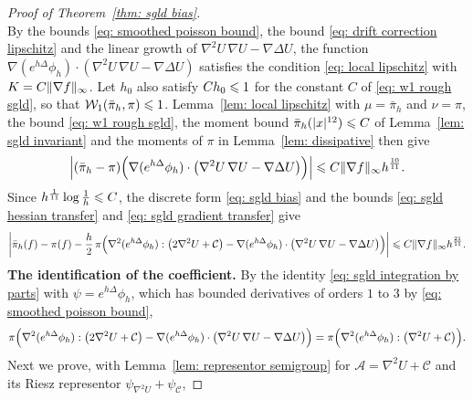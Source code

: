 \begin{proof}[Proof of Theorem~\ref{thm: sgld bias}]
\begin{equation}
    \end{equation}
    By the bounds \eqref{eq: smoothed poisson bound}, the bound \eqref{eq: drift correction lipschitz} and the linear growth of $\nabla^2 U\, \nabla U - \nabla \Delta U$, the function $\nabla ( e^{h\Delta} \phi_h ) \cdot ( \nabla^2 U\, \nabla U - \nabla \Delta U )$ satisfies the condition \eqref{eq: local lipschitz} with $K = C \lVert \nabla f \rVert_\infty$. Let $h_0$ also satisfy $C h_0 \leqslant 1$ for the constant $C$ of \eqref{eq: w1 rough sgld}, so that $\mathcal W_1(\bar\pi_h, \pi) \leqslant 1$. Lemma~\ref{lem: local lipschitz} with $\mu = \bar\pi_h$ and $\nu = \pi$, the bound \eqref{eq: w1 rough sgld}, the moment bound $\bar\pi_h(|x|^{12}) \leqslant C$ of Lemma~\ref{lem: sgld invariant} and the moments of $\pi$ in Lemma~\ref{lem: dissipative} then give
    \begin{equation}
        \Bigl| ( \bar\pi_h - \pi )\Bigl( \nabla ( e^{h\Delta} \phi_h ) \cdot \bigl( \nabla^2 U\, \nabla U - \nabla \Delta U \bigr) \Bigr) \Bigr| \leqslant C \lVert \nabla f \rVert_\infty h^{\frac{10}{11}} .
        \label{eq: sgld gradient transfer}
    \end{equation}
    Since $h^{\frac{1}{11}} \log\frac1h \leqslant C$, the discrete form \eqref{eq: sgld bias} and the bounds \eqref{eq: sgld hessian transfer} and \eqref{eq: sgld gradient transfer} give
    \begin{equation}
        \biggl| \bar\pi_h(f) - \pi(f) - \frac h2\, \pi\Bigl( \nabla^2 ( e^{h\Delta} \phi_h ) : \bigl( 2\nabla^2 U + \mathcal C \bigr) - \nabla ( e^{h\Delta} \phi_h ) \cdot \bigl( \nabla^2 U\, \nabla U - \nabla \Delta U \bigr) \Bigr) \biggr| \leqslant C \lVert \nabla f \rVert_\infty h^{\frac{21}{11}} .
        \label{eq: sgld under pi}
    \end{equation}
    \textbf{The identification of the coefficient.} By the identity \eqref{eq: sgld integration by parts} with $\psi = e^{h\Delta} \phi_h$, which has bounded derivatives of orders $1$ to $3$ by \eqref{eq: smoothed poisson bound},
    \begin{equation}
        \pi\Bigl( \nabla^2 ( e^{h\Delta} \phi_h ) : \bigl( 2\nabla^2 U + \mathcal C \bigr) - \nabla ( e^{h\Delta} \phi_h ) \cdot \bigl( \nabla^2 U\, \nabla U - \nabla \Delta U \bigr) \Bigr) = \pi\Bigl( \nabla^2 ( e^{h\Delta} \phi_h ) : \bigl( \nabla^2 U + \mathcal C \bigr) \Bigr) .
        \label{eq: sgld coefficient riesz}
    \end{equation}
    Next we prove, with Lemma~\ref{lem: representor semigroup} for $\mathcal A = \nabla^2 U + \mathcal C$ and its Riesz representor $\psi_{\nabla^2 U} + \psi_{\mathcal C}$,

\end{proof}
